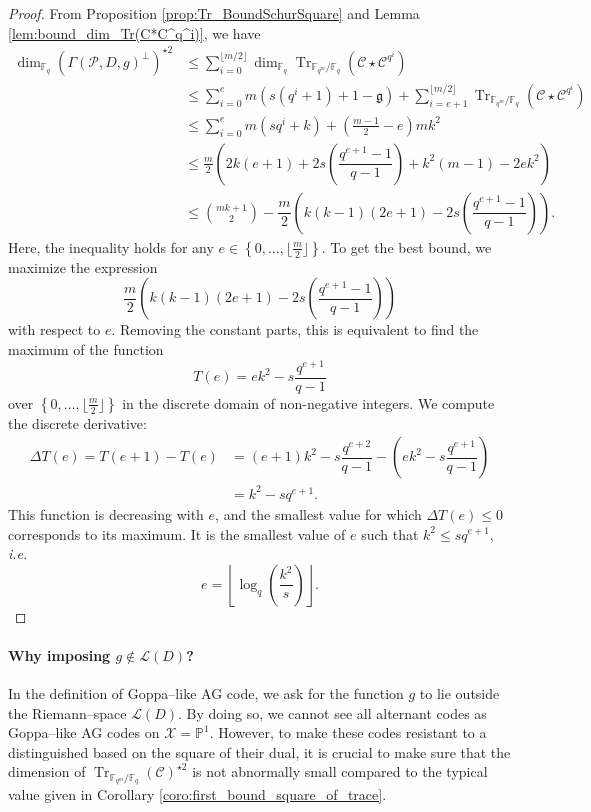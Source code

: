 \documentclass[a4paper]{article}
\theoremstyle{definition}
\theoremstyle{remark}
\newcommand{\calP}{\mathcal{P}}
\newcommand{\calL}{\mathcal{L}}
\newcommand{\calC}{\mathcal{C}}
\newcommand{\calX}{\mathcal{X}}
\newcommand{\fq}{\mathbb{F}_{q}}
\newcommand{\PP}{\mathbb{P}}
\newcommand{\Tr}[1]{\operatorname{Tr}_{\mathbb{F}_{q^m}/\fq}\left(#1\right)}
\newcommand{\set}[1]{\left\{#1\right\}}
\begin{document}
\begin{proof}
    From Proposition \ref{prop:Tr_BoundSchurSquare} and Lemma \ref{lem:bound_dim_Tr(C*C^q^i)}, we have 
    \begin{align*}
        \dim_{\fq}(\Gamma(\calP,D,g)^{\perp})^{\star 2}
        & \leq \sum\limits_{i=0}^{\lfloor m/2 \rfloor} \dim_{\fq} \Tr{\calC \star \calC^{q^i}} \\
        & \leq \sum\limits_{i=0}^{e} m(s(q^i+1)+1-\mathfrak{g})  + \sum\limits_{i=e+1}^{\lfloor m/2 \rfloor} \Tr{\calC \star \calC^{q^i}} \\
        & \leq \sum\limits_{i=0}^{e} m(sq^i+k) + \left( \frac{m-1}{2} -e \right)mk^2 \\
        & \leq \frac{m}{2}\left(2k(e+1)+2s\left(\dfrac{q^{e+1}-1}{q-1}\right)+k^2(m-1)-2ek^2  \right) \\
        & \leq \binom{mk+1}{2} -  \dfrac{m}{2}\left(k(k-1)(2e+1)-2s\left(\dfrac{q^{e+1}-1}{q-1}\right)\right).
    \end{align*}
Here, the inequality holds for any $e \in \set{0,\dots,\lfloor \frac{m}{2} \rfloor}$. To get the best bound, we maximize the expression $$ \dfrac{m}{2}\left(k(k-1)(2e+1)-2s\left(\dfrac{q^{e+1}-1}{q-1}\right)\right)$$ with respect to $e$. Removing the constant parts, this is equivalent to find the maximum of the function
$$T(e) = ek^2-s\dfrac{q^{e+1}}{q-1}$$
over $\set{0,\dots,\lfloor \frac{m}{2} \rfloor}$ in the discrete domain of non-negative integers.  
We compute the discrete derivative:
\begin{align*}
    \Delta T(e) = T(e+1)-T(e) &= (e+1)k^2-s\dfrac{q^{e+2}}{q-1} - \left(ek^2-s\dfrac{q^{e+1}}{q-1}\right) \\
                              &= k^2 - sq^{e+1}.
\end{align*}
This function is decreasing with $e$, and the smallest value for which $\Delta T(e) \leq 0$ corresponds to its maximum. It is the smallest value of $e$ such that $k^2 \leq sq^{e+1}$, \emph{i.e.}
$$e =  \left\lfloor \log_q\left(\dfrac{k^2}{s}\right)\right\rfloor.$$
\end{proof}

\paragraph{Why imposing $g \notin \calL(D)$?} In the definition of Goppa--like AG code, we ask for the function $g$ to lie outside the Riemann--space $\calL(D)$. By doing so, we cannot see all alternant codes as Goppa--like AG codes on $\calX=\PP^1$. However, to make these codes resistant to a distinguished based on the square of their dual, it is crucial to make sure that the dimension of $\Tr{\calC}^{\star 2}$ is not abnormally small compared to the typical value given in Corollary \ref{coro:first_bound_square_of_trace}. 
\end{document}
